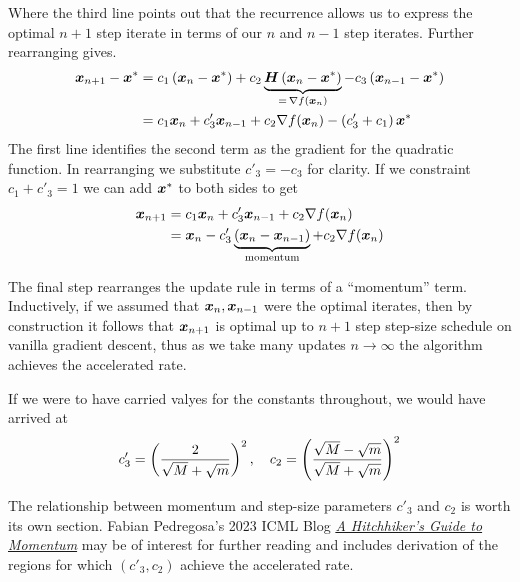 \documentclass[11pt]{article}
\begin{document}
Where the third line points out that the recurrence allows us to express the optimal $n+1$ step iterate in terms of our $n$ and $n-1$ step iterates. Further rearranging gives.
\begin{align*}
    \bm{x}_{n+1} - \bm{x}^* &=  c_1\left(\bm{x}_n - \bm{x}^*\right) +c_2 \underbrace{\bm{H} \left(\bm{x}_n - \bm{x}^*\right)}_{=\,\nabla f(\bm{x}_n)} - c_3\left(\bm{x}_{n-1} - \bm{x}^*\right)\\
    &= c_1\bm{x}_n + c'_3\bm{x}_{n-1} + c_2 \nabla f(\bm{x}_n) - \left(c'_3 + c_1\right)\bm{x}^* \\
\end{align*}
The first line identifies the second term as the gradient for the quadratic function. In rearranging we substitute $c'_3=-c_3$ for clarity. If we constraint $c_1 + c'_3 = 1$ we can add $\bm{x}^*$ to both sides to get
\begin{align*}
    \bm{x}_{n+1} &=  c_1\bm{x}_n + c'_3\bm{x}_{n-1} + c_2 \nabla f(\bm{x}_n)\\
    &= \bm{x}_n  - c'_3\underbrace{\left(\bm{x}_n- \bm{x}_{n-1}\right)}_{\text{momentum}} + c_2 \nabla f(\bm{x}_n)
\end{align*}

The final step rearranges the update rule in terms of a ``momentum'' term. Inductively, if we assumed that $\bm{x}_n, \bm{x}_{n-1}$ were the optimal iterates, then by construction it follows that $\bm{x}_{n+1}$ is optimal up to $n+1$ step step-size schedule on vanilla gradient descent, thus as we take many updates $n\rightarrow \infty$ the algorithm achieves the accelerated rate.

If we were to have carried valyes for the constants throughout, we would have arrived at
\[
c'_3 = \left(\frac{2}{\sqrt{M}+\sqrt{m}}\right)^2, \quad c_2 =  \left(\frac{\sqrt{M}-\sqrt{m}}{\sqrt{M}+\sqrt{m}}\right)^2
\]



The relationship between momentum and step-size parameters $c'_3$ and $c_2$ is worth its own section. Fabian Pedregosa's 2023 ICML Blog \href{https://iclr-blogposts.github.io/2023/blog/2023/hitchhikers-momentum/}{\textit{A Hitchhiker's Guide to Momentum}} may be of interest for further reading and includes derivation of the regions for which $(c'_3, c_2)$ achieve the accelerated rate. 



\end{document}
